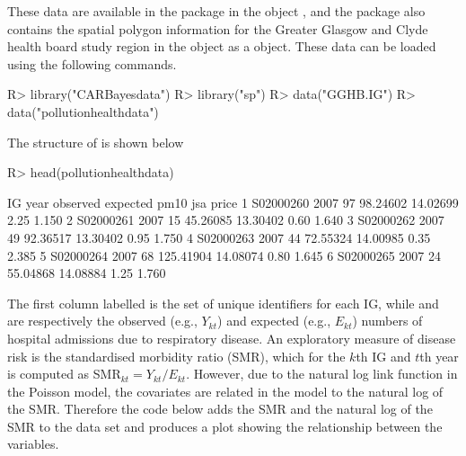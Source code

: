 \documentclass[article, nojss]{jss}
\begin{document}
These data are available in the  package in the object , and the package also contains the spatial polygon information for the Greater Glasgow and Clyde health board study region in the object  as a  object. These data can be loaded using the following commands.




\begin{Schunk}
\begin{Sinput}
R>  library("CARBayesdata")
R>  library("sp")
R>  data("GGHB.IG")
R>  data("pollutionhealthdata")
\end{Sinput}
\end{Schunk}


The structure of  is shown below

\begin{Schunk}
\begin{Sinput}
R>  head(pollutionhealthdata)
\end{Sinput}
\begin{Soutput}
         IG year observed  expected     pm10  jsa price
1 S02000260 2007       97  98.24602 14.02699 2.25 1.150
2 S02000261 2007       15  45.26085 13.30402 0.60 1.640
3 S02000262 2007       49  92.36517 13.30402 0.95 1.750
4 S02000263 2007       44  72.55324 14.00985 0.35 2.385
5 S02000264 2007       68 125.41904 14.08074 0.80 1.645
6 S02000265 2007       24  55.04868 14.08884 1.25 1.760
\end{Soutput}
\end{Schunk}

The first column labelled  is the set of unique identifiers for each IG, while  and  are respectively the observed (e.g., $Y_{kt}$) and expected (e.g., $E_{kt}$) numbers of hospital admissions due to respiratory disease. An exploratory measure of disease risk is the standardised morbidity ratio (SMR), which for the $k$th IG and $t$th year is computed as SMR$_{kt}=Y_{kt}/E_{kt}$. However, due to the natural log link function in the Poisson model, the covariates are related in the model to the natural log of the SMR. Therefore the code below adds the SMR and the natural log of the SMR to the data set and produces a  plot showing the relationship between the variables.


\begin{Schunk}
\end{Schunk}
\end{document}
